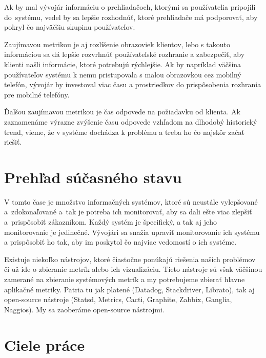 \documentclass[a4paper, upjsfrontpage, thesismargins, thesislinespacing]{rnthesis}
\begin{document}
Ak by mal vývojár informáciu o prehliadačoch, ktorými sa používatelia pripojili do~systému, vedel by sa lepšie rozhodnúť, ktoré prehliadače má podporovať, aby pokryl čo najväčšiu skupinu používateľov.

Zaujímavou metrikou je aj rozlíšenie obrazoviek klientov, lebo s takouto informáciou sa dá lepšie rozvrhnúť používateľské rozhranie a zabezpečiť, aby klienti našli informácie, ktoré potrebujú rýchlejšie.
Ak by napríklad väčšina používateľov systému k nemu pristupovala s malou obrazovkou cez mobilný telefón, vývojár by investoval viac času a prostriedkov do prispôsobenia rozhrania pre mobilné telefóny.

Ďalšou zaujímavou metrikou je čas odpovede na požiadavku od klienta.
Ak zaznamenáme výrazne zvýšenie času odpovede vzhľadom na dlhodobý historický trend, vieme, že v systéme dochádza k problému a treba ho čo najskôr začať riešiť.

 \section{Prehľad súčasného stavu}

V tomto čase je množstvo informačných systémov, ktoré sú neustále vylepšované a~zdokonaľované a~tak je potreba ich monitorovať, aby sa dali ešte viac zlepšiť a~prispôsobiť zákazníkom.
Každý systém je špecifický, a tak aj jeho monitorovanie je jedinečné.
Vývojári sa snažia upraviť monitorovanie ich systému a prispôsobiť ho tak, aby im poskytol čo najviac vedomostí o ich systéme.

Existuje niekoľko nástrojov, ktoré čiastočne ponúkajú riešenia našich problémov či už ide o zbieranie metrík alebo ich vizualizáciu.
Tieto nástroje sú však väčšinou zamerané na zbieranie systémových metrík a my potrebujeme zbierať hlavne aplikačné metriky.
Patria tu jak platené (Datadog, Stackdriver, Librato), tak aj open-source nástroje (Statsd, Metrics, Cacti, Graphite, Zabbix, Ganglia, Naggios).
My sa zaoberáme open-source nástrojmi.


\section{Ciele práce}
\end{document}
